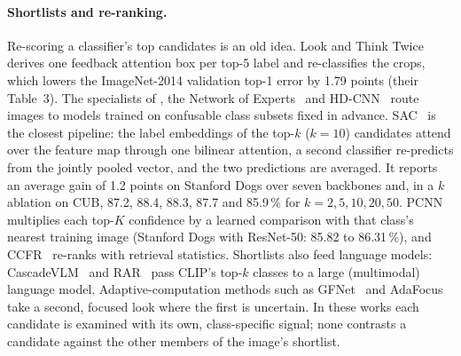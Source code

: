\documentclass[11pt,a4paper]{article}
\theoremstyle{plain}
\begin{document}
\paragraph{Shortlists and re-ranking.}
Re-scoring a classifier's top candidates is an old idea. Look and Think Twice~\citep{cao2015lookthink} derives one
feedback attention box per top-5 label and re-classifies the crops, which lowers the ImageNet-2014 validation top-1
error by 1.79 points (their Table~3). The specialists of \citet{hinton2015distilling}, the Network of
Experts~\citep{ahmed2016networkexperts} and HD-CNN~\citep{yan2015hdcnn} route images to models trained on confusable
class subsets fixed in advance. SAC~\citep{do2024sac} is the closest pipeline: the label embeddings of the top-$k$
($k=10$) candidates attend over the feature map through one bilinear attention, a second classifier re-predicts from
the jointly pooled vector, and the two predictions are averaged. It reports an average gain of 1.2 points on
Stanford Dogs over seven backbones and, in a $k$ ablation on CUB, 87.2, 88.4, 88.3, 87.7 and 85.9\,\% for
$k=2,5,10,20,50$. PCNN~\citep{nguyen2024pcnn} multiplies each top-$K$ confidence by a learned comparison with that
class's nearest training image (Stanford Dogs with ResNet-50: 85.82 to 86.31\,\%), and CCFR~\citep{yang2021ccfr}
re-ranks with retrieval statistics. Shortlists also feed language models: CascadeVLM~\citep{wei2024cascadevlm} and
RAR~\citep{liu2026rar} pass CLIP's top-$k$ classes to a large (multimodal) language model. Adaptive-computation
methods such as GFNet~\citep{wang2020gfnet} and AdaFocus~\citep{wang2021adafocus,wang2022adafocusv2,wang2022adafocusv3}
take a second, focused look where the first is uncertain. In these works each candidate is examined with its own,
class-specific signal; none contrasts a candidate against the other members of the image's shortlist.
\end{document}
